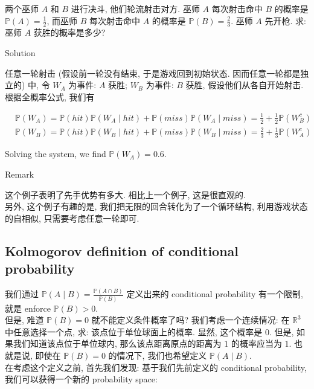 \documentclass{qlnotes-export}
\begin{document}
\begin{example}[(Wizards)]

两个巫师 \(A\) 和 \(B\) 进行决斗, 他们轮流射击对方. 巫师 \(A\) 每次射击命中 \(B\) 的概率是 \({\mathbb{P}}(A) = \frac{1}{2}\), 而巫师 \(B\) 每次射击命中 \(A\) 的概率是 \({\mathbb{P}}(B) = \frac{2}{3}\). 巫师 \(A\) 先开枪. 求: 巫师 \(A\) 获胜的概率是多少?\\

\begin{qlsolution}{Solution}

任意一轮射击 (假设前一轮没有结束, 于是游戏回到初始状态. 因而任意一轮都是独立的) 中, 令 \(W_{A}\) 为事件: \(A\) 获胜; \(W_{B}\) 为事件: \(B\) 获胜, 假设他们从各自开始射击. 根据全概率公式, 我们有

\[\begin{matrix}
 & {{\mathbb{P}}\left( W_{A} \right) = {\mathbb{P}}(hit){\mathbb{P}}\left( {W_{A} \mid hit} \right) + {\mathbb{P}}(miss){\mathbb{P}}\left( {W_{A} \mid miss} \right) = \frac{1}{2} + \frac{1}{2}{\mathbb{P}}\left( W_{B}^{c} \right)} \\
 & {{\mathbb{P}}\left( W_{B} \right) = {\mathbb{P}}(hit){\mathbb{P}}\left( {W_{B} \mid hit} \right) + {\mathbb{P}}(miss){\mathbb{P}}\left( {W_{B} \mid miss} \right) = \frac{2}{3} + \frac{1}{3}{\mathbb{P}}\left( W_{A}^{c} \right)}
\end{matrix}\]

Solving the system, we find \({\mathbb{P}}\left( W_{A} \right) = 0.6\).

\end{qlsolution}

\begin{qlremark}{Remark}

这个例子表明了先手优势有多大. 相比上一个例子, 这是很直观的.\\
另外, 这个例子有趣的是, 我们把无限的回合转化为了一个循环结构, 利用游戏状态的自相似, 只需要考虑任意一轮即可.

\end{qlremark}

\end{example}

\subsection{Kolmogorov definition of conditional probability}\label{kolmogorov-definition-of-conditional-probability}

我们通过 \({\mathbb{P}}(A \mid B) = \frac{{\mathbb{P}}(A \cap B)}{{\mathbb{P}}(B)}\) 定义出来的 conditional probability 有一个限制, 就是 enforce \({\mathbb{P}}(B) > 0\).\\
但是, 难道 \({\mathbb{P}}(B) = 0\) 就不能定义条件概率了吗? 我们考虑一个连续情况: 在 \({\mathbb{R}}^{3}\) 中任意选择一个点, 求: 该点位于单位球面上的概率. 显然, 这个概率是 0. 但是, 如果我们知道该点位于单位球内, 那么该点距离原点的距离为 \(1\) 的概率应当为 \(1\). 也就是说, 即使在 \({\mathbb{P}}(B) = 0\) 的情况下, 我们也希望定义 \({\mathbb{P}}(A \mid B)\).\\
在考虑这个定义之前, 首先我们发现: 基于我们先前定义的 conditional probability, 我们可以获得一个新的 probability space:
\end{document}
